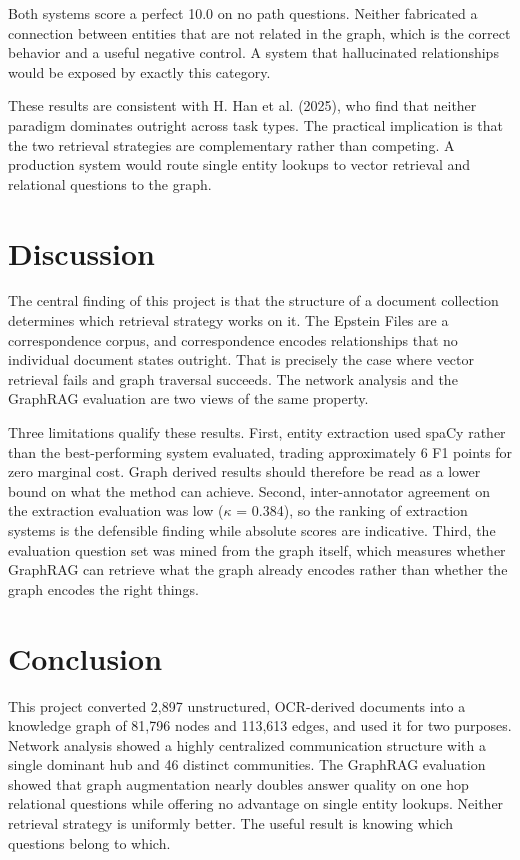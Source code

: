 \documentclass[
  letterpaper,
  DIV=11,
  numbers=noendperiod]{scrartcl}
\begin{document}
Both systems score a perfect 10.0 on no path questions. Neither
fabricated a connection between entities that are not related in the
graph, which is the correct behavior and a useful negative control. A
system that hallucinated relationships would be exposed by exactly this
category.

These results are consistent with H. Han et al. (2025), who find that
neither paradigm dominates outright across task types. The practical
implication is that the two retrieval strategies are complementary
rather than competing. A production system would route single entity
lookups to vector retrieval and relational questions to the graph.

\section{Discussion}\label{discussion}

The central finding of this project is that the structure of a document
collection determines which retrieval strategy works on it. The Epstein
Files are a correspondence corpus, and correspondence encodes
relationships that no individual document states outright. That is
precisely the case where vector retrieval fails and graph traversal
succeeds. The network analysis and the GraphRAG evaluation are two views
of the same property.

Three limitations qualify these results. First, entity extraction used
spaCy rather than the best-performing system evaluated, trading
approximately 6 F1 points for zero marginal cost. Graph derived results
should therefore be read as a lower bound on what the method can
achieve. Second, inter-annotator agreement on the extraction evaluation
was low (\(\kappa\) = 0.384), so the ranking of extraction systems is
the defensible finding while absolute scores are indicative. Third, the
evaluation question set was mined from the graph itself, which measures
whether GraphRAG can retrieve what the graph already encodes rather than
whether the graph encodes the right things.

\section{Conclusion}\label{conclusion}

This project converted 2,897 unstructured, OCR-derived documents into a
knowledge graph of 81,796 nodes and 113,613 edges, and used it for two
purposes. Network analysis showed a highly centralized communication
structure with a single dominant hub and 46 distinct communities. The
GraphRAG evaluation showed that graph augmentation nearly doubles answer
quality on one hop relational questions while offering no advantage on
single entity lookups. Neither retrieval strategy is uniformly better.
The useful result is knowing which questions belong to which.
\end{document}
